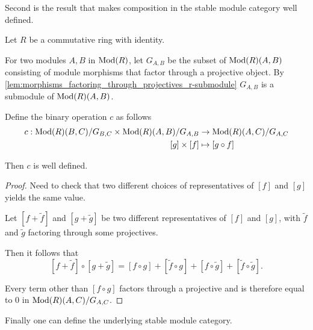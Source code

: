 Second is the result that makes composition in the stable module category well defined.

\begin{lemma}
    \label{lem:stmod_composition_well-defined}
    Let \( R \) be a commutative ring with identity.

    For two modules \( A, B \) in \( \operatorname{Mod}(R) \), let \( G_{A, B} \) be the subset of \( \operatorname{Mod}(R)(A, B) \) consisting of module morphisms that factor through a projective object. By \autoref{lem:morphisms_factoring_through_projectives_r-submodule} \( G_{A, B} \) is a submodule of \( \operatorname{Mod}(R)(A, B) \).

    Define the binary operation \( c \) as follows
    \begin{align*}
        c: \operatorname{Mod}(R)(B, C)/G_{B,C} \times \operatorname{Mod}(R)(A, B)/G_{A,B} &\to \operatorname{Mod}(R)(A, C)/G_{A,C} \\
        [g] \times [f] &\mapsto [g \circ f]
    \end{align*}

    Then \( c \) is well defined.
\end{lemma}
\begin{proof}
    Need to check that two different choices of representatives of \( [f] \) and \( [g] \) yields the same value.

    Let \( [f + \widetilde{f}] \) and \( [g + \widetilde{g}] \) be two different representatives of \( [f] \) and \( [g] \), with \( \widetilde{f} \) and \( \widetilde{g} \) factoring through some projectives.

    Then it follows that
    \[
        [f + \widetilde{f}] \circ [g + \widetilde{g}] = [f \circ g] + [\widetilde{f} \circ g] + [f \circ \widetilde{g}] + [\widetilde{f} \circ \widetilde{g}].
    \]
    
    Every term other than \( [f \circ g] \) factors through a projective and is therefore equal to \( 0 \) in \( \operatorname{Mod}(R)(A, C)/G_{A,C} \).
\end{proof}

Finally one can define the underlying stable module category.

